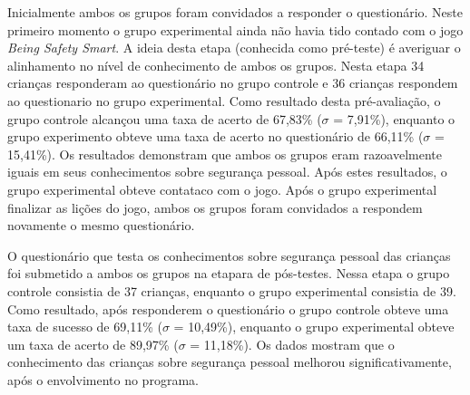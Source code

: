 
Inicialmente ambos os grupos foram convidados a responder o questionário. Neste primeiro momento o grupo experimental ainda não havia tido contado com o jogo \textit{Being Safety Smart}. A ideia desta etapa (conhecida como pré-teste) é averiguar o alinhamento no nível de conhecimento de ambos os grupos. Nesta etapa 34 crianças responderam ao questionário no grupo controle e 36 crianças respondem ao questionario no grupo experimental. Como resultado desta pré-avaliação, o grupo controle alcançou uma taxa de acerto de 67,83\% ($\sigma$ = 7,91\%), enquanto o grupo experimento obteve uma taxa de acerto no questionário de 66,11\% ($\sigma$ = 15,41\%). Os resultados demonstram que ambos os grupos eram razoavelmente iguais em seus conhecimentos sobre segurança pessoal. Após estes resultados, o grupo experimental obteve contataco com o jogo. Após o grupo experimental finalizar as lições do jogo, ambos os grupos foram convidados a respondem novamente o mesmo questionário. 

O questionário que testa os conhecimentos sobre segurança pessoal das crianças foi submetido a ambos os grupos na etapara de pós-testes. Nessa etapa o grupo controle  consistia de 37  crianças, enquanto o grupo experimental consistia de 39. Como resultado, após responderem o questionário o grupo controle obteve uma taxa de sucesso de 69,11\% ($\sigma$ = 10,49\%), enquanto o grupo experimental obteve um taxa de acerto de 89,97\% ($\sigma$ = 11,18\%). Os dados mostram que o conhecimento das crianças sobre segurança pessoal melhorou significativamente, após o envolvimento no programa.  




